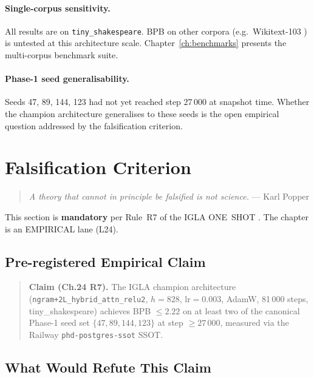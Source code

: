 \paragraph{Single-corpus sensitivity.}
All results are on \texttt{tiny\_shakespeare}.  BPB on other corpora
(e.g.\ Wikitext-103 \cite{merity_wikitext}) is untested at this architecture
scale.  Chapter~\ref{ch:benchmarks} presents the multi-corpus benchmark suite.

\paragraph{Phase-1 seed generalisability.}
Seeds 47, 89, 144, 123 had not yet reached step 27\,000 at snapshot time.
Whether the champion architecture generalises to these seeds is the open
empirical question addressed by the falsification criterion.

\section{Falsification Criterion}
\label{sec:ch24-falsify}

\begin{quote}
\textit{A theory that cannot in principle be falsified is not science.}
--- Karl Popper \cite{popper_logic_discovery}
\end{quote}

This section is \textbf{mandatory} per Rule~R7 of the IGLA ONE~SHOT
\cite{trios_issue_265}.  The chapter is an EMPIRICAL lane (L24).

\subsection{Pre-registered Empirical Claim}
\label{subsec:ch24-falsify-claim}

\begin{quote}
  \textbf{Claim (Ch.24 R7).}  The IGLA champion architecture
  (\texttt{ngram+2L\_hybrid\_attn\_relu2}, $h = 828$, $\mathrm{lr} = 0.003$,
  AdamW, 81\,000 steps, tiny\_shakespeare) achieves BPB $\leq 2.22$ on at
  least two of the canonical Phase-1 seed set $\{47, 89, 144, 123\}$ at step
  $\geq 27\,000$, measured via the Railway \texttt{phd-postgres-ssot} SSOT.
\end{quote}

\subsection{What Would Refute This Claim}
\label{subsec:ch24-falsify-refute}

